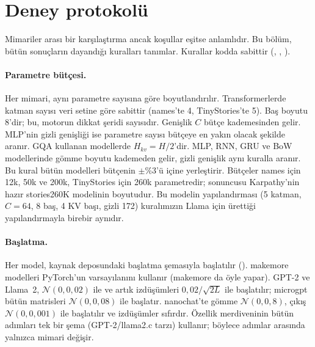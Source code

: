\section{Deney protokolü}\label{sec:protokol}

Mimariler arası bir karşılaştırma ancak koşullar eşitse anlamlıdır. Bu bölüm, bütün sonuçların dayandığı kuralları
tanımlar. Kurallar kodda sabittir (, , ).

\paragraph{Parametre bütçesi.} Her mimari, aynı parametre sayısına göre boyutlandırılır. Transformerlerde katman sayısı
veri setine göre sabittir (names'te 4, TinyStories'te 5). Baş boyutu 8'dir; bu, motorun dikkat şeridi sayısıdır. Genişlik
$C$ bütçe kademesinden gelir. MLP'nin gizli genişliği ise parametre sayısı bütçeye en yakın olacak şekilde aranır.
GQA kullanan modellerde $H_{kv}=H/2$'dir. MLP, RNN, GRU ve BoW modellerinde gömme boyutu kademeden gelir, gizli genişlik
aynı kuralla aranır. Bu kural bütün modelleri bütçenin $\pm\%3$'ü içine yerleştirir. Bütçeler names için 12k, 50k ve 200k,
TinyStories için 260k parametredir; sonuncusu Karpathy'nin hazır stories260K modelinin boyutudur. Bu modelin
yapılandırması (5 katman, $C=64$, 8 baş, 4 KV başı, gizli 172) kuralımızın Llama için ürettiği yapılandırmayla birebir
aynıdır.

\paragraph{Başlatma.} Her model, kaynak deposundaki başlatma şemasıyla başlatılır ().
makemore modelleri PyTorch'un varsayılanını kullanır (makemore da öyle yapar). GPT-2 ve Llama~2, $\mathcal{N}(0, 0{,}02)$
ile ve artık izdüşümleri $0{,}02/\sqrt{2L}$ ile başlatılır; microgpt bütün matrisleri $\mathcal{N}(0, 0{,}08)$ ile
başlatır. nanochat'te gömme $\mathcal{N}(0, 0{,}8)$, çıkış $\mathcal{N}(0, 0{,}001)$ ile başlatılır ve izdüşümler sıfırdır.
Özellik merdiveninin bütün adımları tek bir şema (GPT-2/llama2.c tarzı) kullanır; böylece adımlar arasında yalnızca
mimari değişir.

